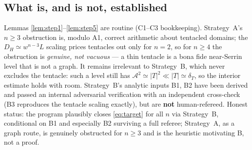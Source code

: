 \documentclass[11pt]{amsart}
\theoremstyle{definition}
\theoremstyle{remark}
\newcommand{\dT}{\delta_T}
\newcommand{\Asym}{\mathcal A}
\begin{document}
\subsection{What is, and is not, established}
Lemmas \ref{lem:step1}--\ref{lem:step5} are routine (C1--C3 bookkeeping).
Strategy~A's $n\ge3$ obstruction is, modulo A1, correct arithmetic
about tentacled domains; the $D_H\simeq w^{n-3}L$ scaling prices
tentacles out only for $n=2$, so for $n\ge4$ the obstruction is
\emph{genuine, not vacuous} --- a thin tentacle is a bona fide
near-Serrin level that is not a graph. It remains irrelevant to
Strategy~B, which never excludes the tentacle: such a level still has
$\Asym^2\simeq|T|^2\ll|T|\simeq\dT$, so the interior estimate holds with
room. Strategy~B's analytic inputs B1, B2 have been derived and passed an
internal adversarial verification with an independent cross-check (B3
reproduces the tentacle scaling exactly), but are \textbf{not} human-refereed.
Honest status: the program plausibly closes \eqref{eq:target} for all $n$ via
Strategy~B, conditional on B1 and especially B2 surviving a full referee;
Strategy~A, as a graph route, is genuinely obstructed for $n\ge3$ and is the
heuristic motivating B, not a proof.
\end{document}
